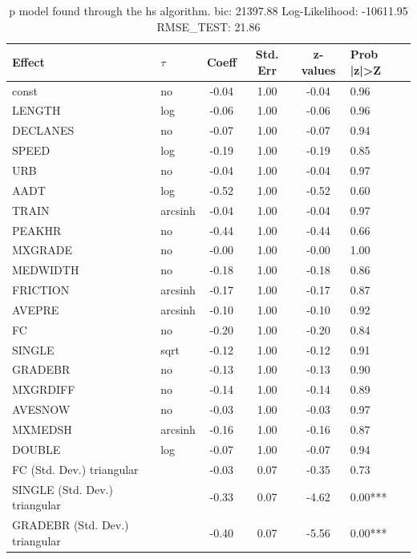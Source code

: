 \begin{table}
	\caption{p model found through the hs algorithm. bic: 21397.88 Log-Likelihood: -10611.95 RMSE_TEST: 21.86}
	\begin{center}
		\begin{tabular}{|l|l|c|c|c|l|}
			\hline
			Effect & $\tau$ & Coeff & Std. Err & z-values & Prob |z|>Z \\
			\hline
			const & no & -0.04 & 1.00 & -0.04 & 0.96 \\
			\hline
			LENGTH & log & -0.06 & 1.00 & -0.06 & 0.96 \\
			\hline
			DECLANES & no & -0.07 & 1.00 & -0.07 & 0.94 \\
			\hline
			SPEED & log & -0.19 & 1.00 & -0.19 & 0.85 \\
			\hline
			URB & no & -0.04 & 1.00 & -0.04 & 0.97 \\
			\hline
			AADT & log & -0.52 & 1.00 & -0.52 & 0.60 \\
			\hline
			TRAIN & arcsinh & -0.04 & 1.00 & -0.04 & 0.97 \\
			\hline
			PEAKHR & no & -0.44 & 1.00 & -0.44 & 0.66 \\
			\hline
			MXGRADE & no & -0.00 & 1.00 & -0.00 & 1.00 \\
			\hline
			MEDWIDTH & no & -0.18 & 1.00 & -0.18 & 0.86 \\
			\hline
			FRICTION & arcsinh & -0.17 & 1.00 & -0.17 & 0.87 \\
			\hline
			AVEPRE & arcsinh & -0.10 & 1.00 & -0.10 & 0.92 \\
			\hline
			FC & no & -0.20 & 1.00 & -0.20 & 0.84 \\
			\hline
			SINGLE & sqrt & -0.12 & 1.00 & -0.12 & 0.91 \\
			\hline
			GRADEBR & no & -0.13 & 1.00 & -0.13 & 0.90 \\
			\hline
			MXGRDIFF & no & -0.14 & 1.00 & -0.14 & 0.89 \\
			\hline
			AVESNOW & no & -0.03 & 1.00 & -0.03 & 0.97 \\
			\hline
			MXMEDSH & arcsinh & -0.16 & 1.00 & -0.16 & 0.87 \\
			\hline
			DOUBLE & log & -0.07 & 1.00 & -0.07 & 0.94 \\
			\hline
			FC (Std. Dev.) triangular &  & -0.03 & 0.07 & -0.35 & 0.73 \\
			\hline
			SINGLE (Std. Dev.) triangular &  & -0.33 & 0.07 & -4.62 & 0.00*** \\
			\hline
			GRADEBR (Std. Dev.) triangular &  & -0.40 & 0.07 & -5.56 & 0.00*** \\

\end{tabular}
\end{center}
\end{table}
